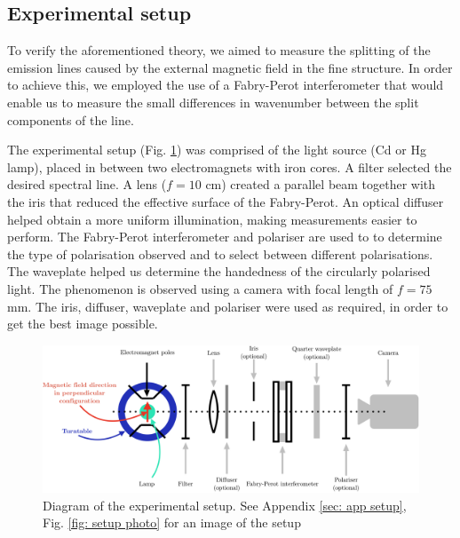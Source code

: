 \documentclass[11pt]{article}
\begin{document}
\subsection{Experimental setup} \label{sec: aparatus}
To verify the aforementioned theory, we aimed to measure the splitting of the emission lines caused by the external magnetic field in the fine structure. In order to achieve this, we employed the use of a Fabry-Perot interferometer that would enable us to measure the small differences in wavenumber between the split components of the line. 

The experimental setup (Fig. \ref{fig: setup}) was comprised of the light source (Cd or Hg lamp), placed in between two electromagnets with iron cores. A filter selected the desired spectral line. A lens ($f = 10$ \si{cm}) created a parallel beam together with the iris that reduced the effective surface of the Fabry-Perot. An optical diffuser helped obtain a more uniform illumination, making measurements easier to perform. The Fabry-Perot interferometer and polariser are used to to determine the type of polarisation observed and to select between different polarisations. The waveplate helped us determine the handedness of the circularly polarised light. The phenomenon is observed using a camera with focal length of $f = 75$ \si{mm}. The iris, diffuser, waveplate and polariser were used as required, in order to get the best image possible. 

\begin{figure}
    \centering
    \includegraphics[width=0.8\linewidth]{setup2.png}
    \captionsetup{justification=centering}
    \caption{Diagram of the experimental setup. See Appendix \ref{sec: app setup}, Fig. \ref{fig: setup photo} for an image of the setup}
    \label{fig: setup}    
\end{figure}
\end{document}
